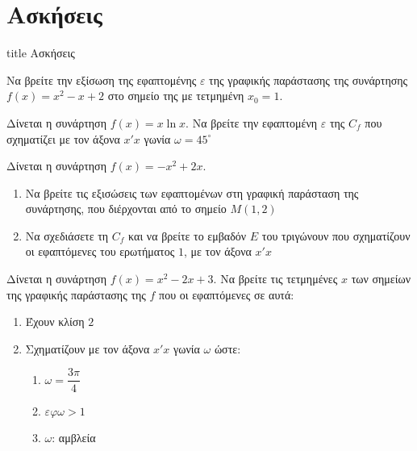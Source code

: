 \documentclass{presentation}
\begin{document}
\section{Ασκήσεις}

\begin{frame}[noframenumbering]
    \vfill
    \centering
    \begin{beamercolorbox}[sep=8pt,center,shadow=true,rounded=true]{title}
        Ασκήσεις
    \end{beamercolorbox}
    \vfill
\end{frame}

\begin{askisi}
    Να βρείτε την εξίσωση της εφαπτομένης $ε$ της γραφικής παράστασης της συνάρτησης $f(x)=x^2-x+2$ στο σημείο της με τετμημένη $x_0=1$.

\end{askisi}

\begin{askisi}
    Δίνεται η συνάρτηση $f(x)=x\ln x$. Να βρείτε την εφαπτομένη $ε$ της $C_f$ που σχηματίζει με τον άξονα $x'x$ γωνία $ω=45^{\circ}$

\end{askisi}

\begin{askisi}
    Δίνεται η συνάρτηση $f(x)=-x^2+2x$.
    \begin{enumerate}
        \item<1-> Να βρείτε τις εξισώσεις των εφαπτομένων στη γραφική παράσταση της συνάρτησης, που διέρχονται από το σημείο $Μ(1,2)$
        \item<2-> Να σχεδιάσετε τη $C_f$ και να βρείτε το εμβαδόν $Ε$ του τριγώνουν που σχηματίζουν οι εφαπτόμενες του ερωτήματος $1$, με τον άξονα $x'x$
    \end{enumerate}

\end{askisi}

\begin{askisi}
    Δίνεται η συνάρτηση $f(x)=x^2-2x+3$. Να βρείτε τις τετμημένες $x$ των σημείων της γραφικής παράστασης της $f$ που οι εφαπτόμενες σε αυτά:
    \begin{enumerate}
        \item<1-> Έχουν κλίση $2$
        \item<2-> Σχηματίζουν με τον άξονα $x'x$ γωνία $ω$ ώστε:
            \begin{enumerate}
                \item<2-> $ω=\dfrac{3π}{4}$
                \item<3-> $εφω>1$
                \item<4-> $ω$: αμβλεία
            \end{enumerate}
    \end{enumerate}

\end{askisi}
\end{document}
